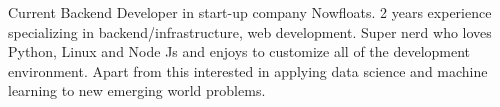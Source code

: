 

\begin{cvparagraph}

Current Backend Developer in start-up company Nowfloats. 2 years experience specializing in backend/infrastructure, web development. Super nerd who loves Python, Linux and Node Js and enjoys to customize all of the development environment. Apart from this interested in applying data science and machine learning to new emerging world problems. 
\end{cvparagraph}
